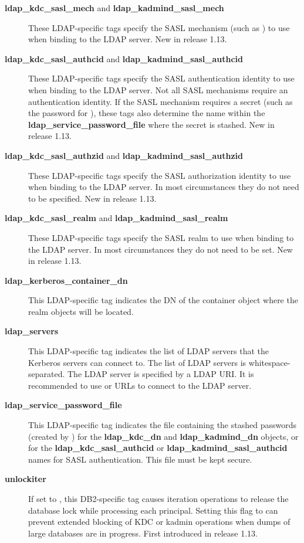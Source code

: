 \documentclass[letterpaper,10pt,english]{sphinxmanual}
\begin{document}
\begin{description}
\item[{\textbf{ldap\_kdc\_sasl\_mech} and \textbf{ldap\_kadmind\_sasl\_mech}}] \leavevmode
These LDAP-specific tags specify the SASL mechanism (such as
) to use when binding to the LDAP server.  New in
release 1.13.

\item[{\textbf{ldap\_kdc\_sasl\_authcid} and \textbf{ldap\_kadmind\_sasl\_authcid}}] \leavevmode
These LDAP-specific tags specify the SASL authentication identity
to use when binding to the LDAP server.  Not all SASL mechanisms
require an authentication identity.  If the SASL mechanism
requires a secret (such as the password for ), these
tags also determine the name within the
\textbf{ldap\_service\_password\_file} where the secret is stashed.  New
in release 1.13.

\item[{\textbf{ldap\_kdc\_sasl\_authzid} and \textbf{ldap\_kadmind\_sasl\_authzid}}] \leavevmode
These LDAP-specific tags specify the SASL authorization identity
to use when binding to the LDAP server.  In most circumstances
they do not need to be specified.  New in release 1.13.

\item[{\textbf{ldap\_kdc\_sasl\_realm} and \textbf{ldap\_kadmind\_sasl\_realm}}] \leavevmode
These LDAP-specific tags specify the SASL realm to use when
binding to the LDAP server.  In most circumstances they do not
need to be set.  New in release 1.13.

\item[{\textbf{ldap\_kerberos\_container\_dn}}] \leavevmode
This LDAP-specific tag indicates the DN of the container object
where the realm objects will be located.

\item[{\textbf{ldap\_servers}}] \leavevmode
This LDAP-specific tag indicates the list of LDAP servers that the
Kerberos servers can connect to.  The list of LDAP servers is
whitespace-separated.  The LDAP server is specified by a LDAP URI.
It is recommended to use  or  URLs to connect
to the LDAP server.

\item[{\textbf{ldap\_service\_password\_file}}] \leavevmode
This LDAP-specific tag indicates the file containing the stashed
passwords (created by ) for the
\textbf{ldap\_kdc\_dn} and \textbf{ldap\_kadmind\_dn} objects, or for the
\textbf{ldap\_kdc\_sasl\_authcid} or \textbf{ldap\_kadmind\_sasl\_authcid} names
for SASL authentication.  This file must be kept secure.

\item[{\textbf{unlockiter}}] \leavevmode
If set to , this DB2-specific tag causes iteration
operations to release the database lock while processing each
principal.  Setting this flag to  can prevent extended
blocking of KDC or kadmin operations when dumps of large databases
are in progress.  First introduced in release 1.13.

\end{description}
\end{document}
